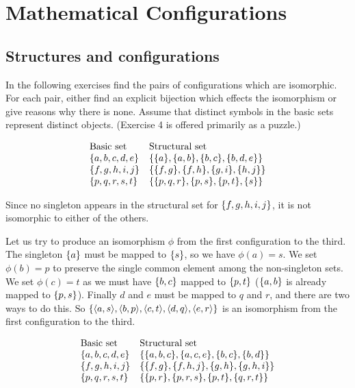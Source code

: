 \chapter{Mathematical Configurations}
\section{Structures and configurations}

In the following exercises find the pairs of configurations which are isomorphic. For
each pair, either find an explicit bijection which effects the isomorphism or give reasons
why there is none. Assume that distinct symbols in the basic sets represent distinct
objects. (Exercise 4 is offered primarily as a puzzle.)

\begin{exercise}
\[
\begin{array}{ll}
    \text{Basic set} & \text{Structural set}\\
    \set{a,b,c,d,e} & \set{\set{a},\set{a,b},\set{b,c},\set{b,d,e}}\\
    \set{f,g,h,i,j} & \set{\set{f,g},\set{f,h},\set{g,i},\set{h,j}}\\
    \set{p,q,r,s,t} & \set{\set{p,q,r},\set{p,s},\set{p,t},\set{s}}
\end{array}
\]
\end{exercise}

\begin{solution}
Since no singleton appears in the structural set for $\left\{f, g, h,i,j\right\}$, it is not isomorphic
to either of the others.

Let us try to produce an isomorphism $\phi$ from the first configuration to the third.
The singleton $\left\{a\right\}$ must be mapped to $\left\{s\right\}$, so we have $\phi(a)=s$.
We set $\phi(b)=p$ to preserve the single common element among the non-singleton sets.
We set $\phi(c)=t$ as we must have $\left\{b,c\right\}$ mapped to $\left\{p,t\right\}$ ($\left\{a,b\right\}$ is already mapped to $\left\{p,s\right\}$).
Finally $d$ and $e$ must be mapped to $q$ and $r$, and there are two ways to do this.
So $\set{\aprn{a,s},\aprn{b,p},\aprn{c,t},\aprn{d,q},\aprn{e,r}}$ is an isomorphism from the
first configuration to the third.
\end{solution}

\begin{exercise}
\[
\begin{array}{ll}
    \text{Basic set} & \text{Structural set}\\
    \set{a,b,c,d,e} & \set{\set{a,b,c},\set{a,c,e},\set{b,c},\set{b,d}}\\
    \set{f,g,h,i,j} & \set{\set{f,g},\set{f,h,j},\set{g,h},\set{g,h,i}}\\
    \set{p,q,r,s,t} & \set{\set{p,r},\set{p,r,s},\set{p,t},\set{q,r,t}}
\end{array}
\]
\end{exercise}

